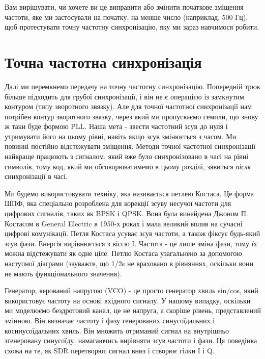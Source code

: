Вам вирішувати, чи хочете ви це виправити або змінити початкове зміщення
частоти, яке ми застосували на початку, на менше число (наприклад, 500
Гц), щоб протестувати точну частотну синхронізацію, яку ми зараз
навчимося робити.

\section{Точна частотна
синхронізація}\label{ux442ux43eux447ux43dux430-ux447ux430ux441ux442ux43eux442ux43dux430-ux441ux438ux43dux445ux440ux43eux43dux456ux437ux430ux446ux456ux44f}

Далі ми перемкнемо передачу на точну частотну синхронізацію. Попередній
трюк більше підходить для грубої синхронізації, і він не є операцією із
замкнутим контуром (типу зворотного зв\textquotesingle язку). Але для
точної частотної синхронізації нам потрібен контур зворотного
зв\textquotesingle язку, через який ми пропускаємо семпли, що знову ж
таки буде формою PLL. Наша мета - звести частотний зсув до нуля і
утримувати його на цьому рівні, навіть якщо зсув змінюється з часом. Ми
повинні постійно відстежувати зміщення. Методи точної частотної
синхронізації найкраще працюють з сигналом, який вже було синхронізовано
в часі на рівні символів, тому код, який ми обговорюватимемо в цьому
розділі, з\textquotesingle явиться \emph{після} синхронізації в часі.

Ми будемо використовувати техніку, яка називається петлею Костаса. Це
форма ШПФ, яка спеціально розроблена для корекції зсуву несучої частоти
для цифрових сигналів, таких як BPSK і QPSK. Вона була винайдена Джоном
П. Костасом в General Electric в 1950-х роках і мала великий вплив на
сучасні цифрові комунікації. Петля Костаса усуває зсув частоти, а також
фіксує будь-який зсув фази. Енергія вирівнюється з віссю I. Частота - це
лише зміна фази, тому їх можна відстежувати як одне ціле. Петлю Костаса
узагальнено за допомогою наступної діаграми (зауважте, що 1/2s не
враховано в рівняннях, оскільки вони не мають функціонального значення).

\href{../_images/costas-loop.svg}{}

Генератор, керований напругою (VCO) - це просто генератор хвиль sin/cos,
який використовує частоту на основі вхідного сигналу. У нашому випадку,
оскільки ми моделюємо бездротовий канал, це не напруга, а скоріше
рівень, представлений змінною. Він визначає частоту і фазу генерованих
синусоїдальних і косинусоїдальних хвиль. Він множить отриманий сигнал на
внутрішньо згенеровану синусоїду, намагаючись вирівняти зсув частоти і
фази. Ця поведінка схожа на те, як SDR перетворює сигнал вниз і створює
гілки I і Q.

